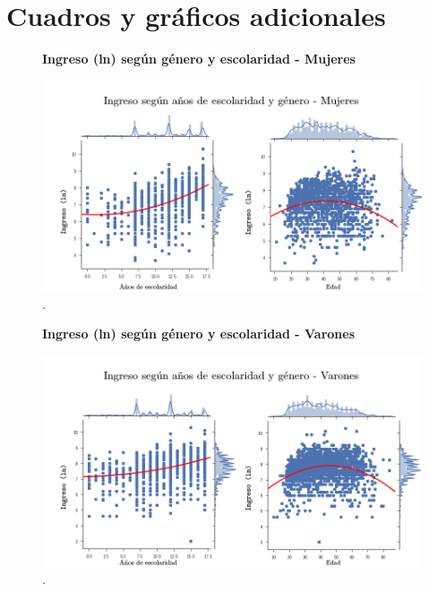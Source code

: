 \section{Cuadros y gráficos adicionales}

 \begin{figure}[!htb]
 	\textbf{Ingreso (ln) según género y escolaridad - Mujeres}\par\medskip
 	\includegraphics[scale = 0.4]{../img/capitulo3/ingresoVedadVescolaridadMujeres.png}
 	\caption{.}
 	\label{fig:ingresoVedadVescolaridadMujeres}
 \end{figure}
 
 \begin{figure}[!htb]
 	\textbf{Ingreso (ln) según género y escolaridad - Varones}\par\medskip
 	\includegraphics[scale = 0.4]{../img/capitulo3/ingresoVedadVescolaridadVarones.png}
 	\caption{.}
 	 \label{fig:ingresoVedadVescolaridadVarones}
 \end{figure}
